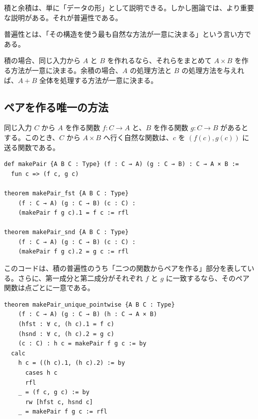 積と余積は、単に「データの形」として説明できる。しかし圏論では、より重要な説明がある。それが普遍性である。

\begin{intuitionbox}
普遍性とは、「その構造を使う最も自然な方法が一意に決まる」という言い方である。

積の場合、同じ入力から \(A\) と \(B\) を作れるなら、それらをまとめて \(A \times B\) を作る方法が一意に決まる。余積の場合、\(A\) の処理方法と \(B\) の処理方法を与えれば、\(A+B\) 全体を処理する方法が一意に決まる。
\end{intuitionbox}

\subsection{ペアを作る唯一の方法}

同じ入力 \(C\) から \(A\) を作る関数 \(f : C \to A\) と、\(B\) を作る関数 \(g : C \to B\) があるとする。このとき、\(C\) から \(A \times B\) へ行く自然な関数は、\(c\) を \((f(c), g(c))\) に送る関数である。


\begin{listing}[htbp]
\begin{verbatim}
def makePair {A B C : Type} (f : C → A) (g : C → B) : C → A × B :=
  fun c => (f c, g c)

theorem makePair_fst {A B C : Type}
    (f : C → A) (g : C → B) (c : C) :
    (makePair f g c).1 = f c := rfl

theorem makePair_snd {A B C : Type}
    (f : C → A) (g : C → B) (c : C) :
    (makePair f g c).2 = g c := rfl
\end{verbatim}
\caption{積の普遍性を関数として表す}
\label{lst:ch07_product_universal}
\end{listing}

このコードは、積の普遍性のうち「二つの関数からペアを作る」部分を表している。さらに、第一成分と第二成分がそれぞれ \(f\) と \(g\) に一致するなら、そのペア関数は点ごとに一意である。

\begin{listing}[htbp]
\begin{verbatim}
theorem makePair_unique_pointwise {A B C : Type}
    (f : C → A) (g : C → B) (h : C → A × B)
    (hfst : ∀ c, (h c).1 = f c)
    (hsnd : ∀ c, (h c).2 = g c)
    (c : C) : h c = makePair f g c := by
  calc
    h c = ((h c).1, (h c).2) := by
      cases h c
      rfl
    _ = (f c, g c) := by
      rw [hfst c, hsnd c]
    _ = makePair f g c := rfl
\end{verbatim}
\caption{積から作る関数の点ごとの一意性}
\label{lst:ch07_product_unique}
\end{listing}

